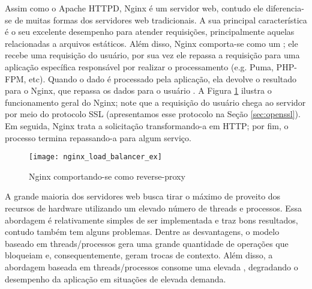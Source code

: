 Assim como o Apache HTTPD, Nginx é um servidor web, contudo ele diferencia-se
de muitas formas dos servidores web tradicionais. A sua principal
característica é o seu excelente desempenho para atender requisições,
principalmente aquelas relacionadas a arquivos estáticos. Além disso, Nginx
comporta-se como um ; ele recebe uma requisição do
usuário, por sua vez ele repassa a requisição para uma aplicação específica
responsável por realizar o processamento (e.g. Puma, PHP-FPM, etc). Quando o
dado é processado pela aplicação, ela devolve o resultado para o Nginx, que
repassa os dados para o usuário \citep{soni}. A Figura \ref{fig:nginx_basico}
ilustra o funcionamento geral do Nginx; note que a requisição do usuário chega
ao servidor  por meio do protocolo SSL (apresentamos esse protocolo
na Seção \ref{sec:openssl}). Em seguida, Nginx trata a solicitação
transformando-a em HTTP; por fim, o processo termina repassando-a
para algum serviço.

\begin{figure}[!h]
  \centering
  \texttt{[image: nginx\_load\_balancer\_ex]} 
  \caption[Nginx comportando-se como reverse-proxy]{Nginx comportando-se como reverse-proxy \citep{soni}}
  \label{fig:nginx_basico} 
\end{figure}

A grande maioria dos servidores web  busca tirar o máximo de proveito dos recursos
de hardware utilizando um elevado número de threads e processos. Essa abordagem
é relativamente simples de ser implementada e traz bons resultados, contudo
também tem alguns problemas. Dentre as desvantagens, o modelo baseado
em threads/processos gera uma grande quantidade de operações que bloqueiam e,
consequentemente, geram trocas de contexto. Além disso, a abordagem baseada em
threads/processos consome uma elevada , degradando o
desempenho da aplicação em situações de elevada demanda.

